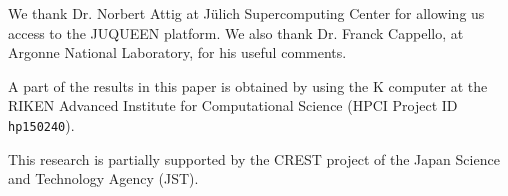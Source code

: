 \documentclass[Afour,times,sagev]{sagej}
\begin{document}
\begin{acks}
We thank Dr. Norbert Attig at J\"{u}lich Supercomputing Center for
allowing us access to the JUQUEEN platform. We also thank Dr. Franck
Cappello, at Argonne National Laboratory, for his useful
comments. 

A part of the results in this paper is obtained by using the K
computer at the RIKEN Advanced Institute for Computational
Science (HPCI Project ID {\tt hp150240}).
\end{acks}

\begin{funding}
This research is partially supported by the CREST project of
the Japan Science and Technology Agency (JST).
\end{funding}



\end{document}
